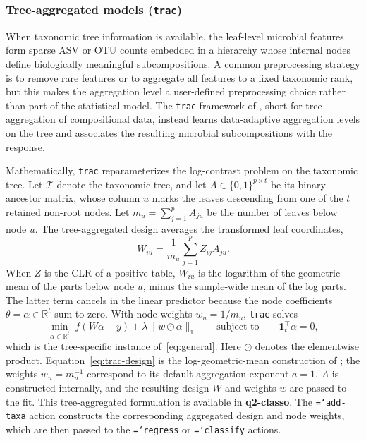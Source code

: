 \documentclass[11pt,a4paper]{article}
\newcommand{\code}[1]{\allowbreak\texttt{\hyphenchar\font=`\-\relax #1}}
\newcommand{\pkg}[1]{\textbf{#1}}
\newcommand{\R}{\mathbb{R}}
\newcommand{\one}{\mathbf{1}}
\begin{document}
\subsubsection{Tree-aggregated models (\texttt{trac})}
\label{sec:trac}

When taxonomic tree information is available, the leaf-level microbial features
form sparse ASV or OTU counts embedded in a hierarchy whose internal nodes define biologically meaningful
subcompositions. A common preprocessing strategy is to remove rare features or
to aggregate all features to a fixed taxonomic rank, but this makes the
aggregation level a user-defined preprocessing choice rather than part of the
statistical model. The \texttt{trac} framework of \citet{bien2021tree}, short for
tree-aggregation of compositional data, instead learns data-adaptive aggregation
levels on the tree and associates the resulting microbial subcompositions with
the response.

Mathematically, \texttt{trac} reparameterizes the log-contrast problem on the taxonomic
tree. Let $\mathcal{T}$ denote the taxonomic tree, and let
$A \in \{0,1\}^{p \times t}$ be its binary ancestor matrix, whose column $u$
marks the leaves descending from one of the $t$ retained non-root nodes.
Let $m_u=\sum_{j=1}^{p}A_{ju}$ be the number of leaves below node $u$.
The tree-aggregated design averages the transformed leaf coordinates,
\begin{equation}
\label{eq:trac-design}
W_{iu}=\frac{1}{m_u}\sum_{j=1}^{p}Z_{ij}A_{ju}.
\end{equation}
When $Z$ is the CLR of a positive table, $W_{iu}$ is the logarithm of the
geometric mean of the parts below node $u$, minus the sample-wide mean of
the log parts. The latter term cancels in the linear predictor because the
node coefficients $\theta=\alpha\in\R^t$ sum to zero. With node weights
$w_u=1/m_u$, \texttt{trac} solves
\begin{equation}
\label{eq:trac}
\min_{\alpha \in \R^{t}}\;
f\!\left(W\alpha - y\right)
+ \lambda \lVert w \odot \alpha \rVert_{1}
\qquad \text{subject to} \qquad \one_{t}^{\top}\alpha = 0 ,
\end{equation}
which is the tree-specific instance of~\eqref{eq:general}.
Here $\odot$ denotes the elementwise product. Equation~\eqref{eq:trac-design}
is the log-geometric-mean construction of \citet{bien2021tree}; the weights
$w_u=m_u^{-1}$ correspond to its default aggregation exponent $a=1$.
$A$ is constructed internally, and the resulting design $W$ and weights $w$
are passed to the fit.
This tree-aggregated formulation is available in \pkg{q2-classo}. The
\code{add-taxa} action constructs the corresponding aggregated design and node
weights, which are then passed to the \code{regress} or \code{classify} actions.
\end{document}
